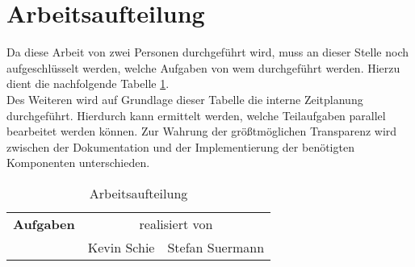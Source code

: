 \section{Arbeitsaufteilung}
\label{sec:Arbeitsaufteilung}
Da diese Arbeit von zwei Personen durchgeführt wird, muss an dieser Stelle noch aufgeschlüsselt werden, welche Aufgaben von wem durchgeführt werden. Hierzu dient die nachfolgende Tabelle \ref{tbl:arbeitsaufteilung}. \\Des Weiteren wird auf Grundlage dieser Tabelle die interne Zeitplanung durchgeführt. Hierdurch kann ermittelt werden, welche Teilaufgaben parallel bearbeitet werden können. Zur Wahrung der größtmöglichen Transparenz wird zwischen der Dokumentation und der Implementierung der benötigten Komponenten unterschieden. 
\begin{table}[]
\caption{Arbeitsaufteilung}
\label{tbl:arbeitsaufteilung}
\begin{tabular}{|l|c|c|}
\hline
{\bf Aufgaben}                                                    & \multicolumn{2}{c|}{realisiert von}                                    \\
                                                                  & \multicolumn{1}{l|}{Kevin Schie} & \multicolumn{1}{l|}{Stefan Suermann} \\


\end{tabular}
\end{table}
